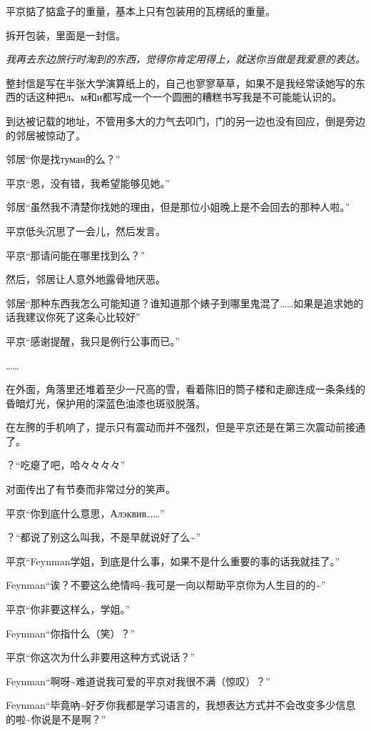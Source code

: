 \documentclass{article}
\begin{document}
平京掂了掂盒子的重量，基本上只有包装用的瓦楞纸的重量。

拆开包装，里面是一封信。

\textit{我再去东边旅行时淘到的东西，觉得你肯定用得上，就送你当做是我爱意的表达。}

整封信是写在半张大学演算纸上的，自己也寥寥草草，如果不是我经常读她写的东西的话这种把л、м和и都写成一个一个圆圈的糟糕书写我是不可能能认识的。

到达被记载的地址，不管用多大的力气去叩门，门的另一边也没有回应，倒是旁边的邻居被惊动了。

邻居“你是找туман的么？”

平京“恩，没有错，我希望能够见她。”

邻居“虽然我不清楚你找她的理由，但是那位小姐晚上是不会回去的那种人啦。”

平京低头沉思了一会儿，然后发言。

平京“那请问能在哪里找到么？”

然后，邻居让人意外地露骨地厌恶。

邻居“那种东西我怎么可能知道？谁知道那个婊子到哪里鬼混了……如果是追求她的话我建议你死了这条心比较好”

平京“感谢提醒，我只是例行公事而已。”

……

在外面，角落里还堆着至少一尺高的雪，看着陈旧的筒子楼和走廊连成一条条线的昏暗灯光，保护用的深蓝色油漆也斑驳脱落。

在左胯的手机响了，提示只有震动而并不强烈，但是平京还是在第三次震动前接通了。

？“吃瘪了吧，哈々々々々”

对面传出了有节奏而非常过分的笑声。

平京“你到底什么意思，Алэквив……”

？“都说了别这么叫我，不是早就说好了么\textasciitilde ”

平京“Feynman学姐，到底是什么事，如果不是什么重要的事的话我就挂了。”

Feynman“诶？不要这么绝情吗\textasciitilde 我可是一向以帮助平京你为人生目的的\textasciitilde ”

平京“你非要这样么，学姐。”

Feynman“你指什么（笑）？”

平京“你这次为什么非要用这种方式说话？”

Feynman“啊呀\textasciitilde 难道说我可爱的平京对我很不满（惊叹）？”

Feynman“毕竟吶\textasciitilde 好歹你我都是学习语言的，我想表达方式并不会改变多少信息的啦\textasciitilde 你说是不是啊？”
\end{document}
